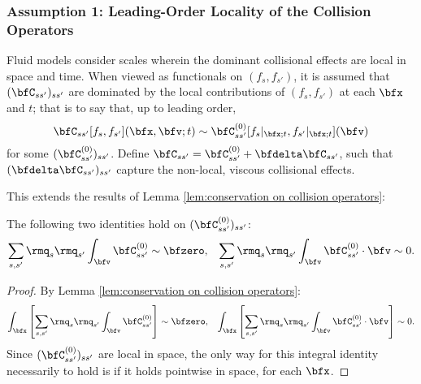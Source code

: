 \subsubsection*{Assumption 1: Leading-Order Locality of the Collision Operators}
    Fluid models consider scales wherein the dominant collisional effects are local in space and time.  When viewed as functionals on $(f_{s}, f_{s'})$, it is assumed that $(\bfC_{ss'})_{ss'}$ are dominated by the local contributions of $(f_{s}, f_{s'})$ at each $\bfx$ and $t$;  that is to say that, up to leading order,
    \begin{equation}\label{eqn:local collision operator}
        \bfC_{ss'}[f_{s}, f_{s'}](\bfx, \bfv; t)  \sim  \bfC_{ss'}^{(0)}[f_{s}|_{\bfx; t}, f_{s'}|_{\bfx; t}](\bfv)
    \end{equation}
    for some $(\bfC_{ss'}^{(0)})_{ss'}$. Define $\bfC_{ss'}  = 
     \bfC_{ss'}^{(0)} + \bfdelta\bfC_{ss'}$, such that $(\bfdelta\bfC_{ss'})_{ss'}$ capture the non-local, viscous collisional effects.
    
    This extends the results of Lemma \ref{lem:conservation on collision operators}:

    \begin{lemma}\label{lem:conservation on local collision operators}
        The following two identities hold on $(\bfC_{ss'}^{(0)})_{ss'}$:
        \begin{align}
            \sum_{s, s'}\rmq_{s}\rmq_{s'}\int_{\bfv}\bfC_{ss'}^{(0)}           \sim  \bfzero,  &&
            \sum_{s, s'}\rmq_{s}\rmq_{s'}\int_{\bfv}\bfC_{ss'}^{(0)}\cdot\bfv  \sim  0.
        \end{align}
    \end{lemma}
    \begin{proof}
        By Lemma \ref{lem:conservation on collision operators}:
        \begin{align}
            \int_{\bfx}\left[\sum_{s, s'}\rmq_{s}\rmq_{s'}\int_{\bfv}\bfC_{ss'}^{(0)}\right]           \sim  \bfzero,  &&
            \int_{\bfx}\left[\sum_{s, s'}\rmq_{s}\rmq_{s'}\int_{\bfv}\bfC_{ss'}^{(0)}\cdot\bfv\right]  \sim  0.
        \end{align}
        Since $(\bfC_{ss'}^{(0)})_{ss'}$ are local in space, the only way for this integral identity necessarily to hold is if it holds pointwise in space, for each $\bfx$.
    \end{proof}